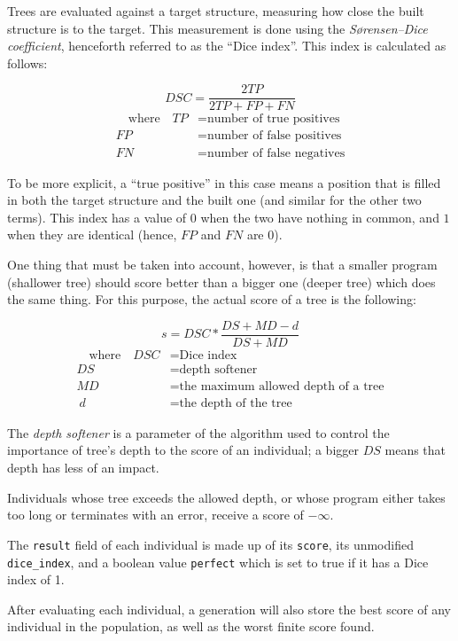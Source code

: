 \documentclass{report}
\begin{document}
Trees are evaluated against a target structure, measuring how close the built structure is to the target. This measurement is done using the \emph{Sørensen–Dice coefficient}\cite{sorensen}\cite{dice}, henceforth referred to as the ``Dice index''. This index is calculated as follows:

$$DSC = \frac{2TP}{2TP + FP + FN}$$
\begin{align*}\quad
    \text{where}\quad
    TP &= \text{number of true positives}\\
    FP &= \text{number of false positives}\\
    FN &= \text{number of false negatives}
\end{align*}

To be more explicit, a ``true positive'' in this case means a position that is filled in both the target structure and the built one (and similar for the other two terms). This index has a value of $0$ when the two have nothing in common, and $1$ when they are identical (hence, $FP$ and $FN$ are $0$).

One thing that must be taken into account, however, is that a smaller program (shallower tree) should score better than a bigger one (deeper tree) which does the same thing. For this purpose, the actual score of a tree is the following:

$$s = DSC * \frac{DS + MD - d}{DS + MD}$$
\begin{align*}\quad
    \text{where}\quad
    DSC &= \text{Dice index}\\
    DS &= \text{depth softener}\\
    MD &= \text{the maximum allowed depth of a tree}\\\
    d &= \text{the depth of the tree}
\end{align*}

\label{depth_softener}

The \emph{depth softener} is a parameter of the algorithm  used to control the importance of tree's depth to the score of an individual; a bigger $DS$ means that depth has less of an impact.

Individuals whose tree exceeds the allowed depth, or whose program either takes too long or terminates with an error, receive a score of $-\infty$.

The \verb|result| field of each individual is made up of its \verb|score|, its unmodified \verb|dice_index|, and a boolean value \verb|perfect| which is set to true if it has a Dice index of 1.

After evaluating each individual, a generation will also store the best score of any individual in the population, as well as the worst finite score found.
\end{document}

